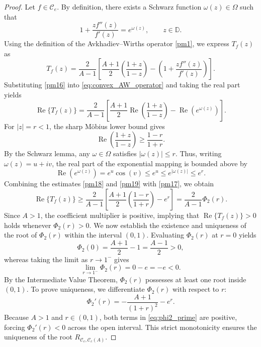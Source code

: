 \documentclass[12pt]{article}
\renewcommand{\Re}{\operatorname{Re}}
\begin{document}
\begin{proof}
Let $f\in\mathcal{C}_e$. By definition, there exists a Schwarz function $\omega(z)\in\Omega$ such that
\begin{equation}\label{pm16}
1+\frac{zf''(z)}{f'(z)} = e^{\omega(z)}, \qquad z\in\mathbb{D}.
\end{equation}
Using the definition of the Avkhadiev--Wirths operator \eqref{pm1}, we express $T_f(z)$ as
\begin{equation}\label{eq:convex_AW_operator}
T_f(z) = \frac{2}{A-1} \left[ \frac{A+1}{2} \left( \frac{1+z}{1-z} \right) - \left( 1+\frac{zf''(z)}{f'(z)} \right) \right].
\end{equation}
Substituting \eqref{pm16} into \eqref{eq:convex_AW_operator} and taking the real part yields
\begin{equation}\label{pm17}
\Re\{T_f(z)\} = \frac{2}{A-1} \left[ \frac{A+1}{2} \Re\left( \frac{1+z}{1-z} \right) - \Re\left( e^{\omega(z)} \right) \right].
\end{equation}
For $|z|=r<1$, the sharp M\"obius lower bound gives
\begin{equation}\label{pm18}
\Re\left( \frac{1+z}{1-z} \right) \ge \frac{1-r}{1+r}.
\end{equation}
By the Schwarz lemma, any $\omega \in \Omega$ satisfies $|\omega(z)|\le r$. Thus, writing $\omega(z)=u+iv$, the real part of the exponential mapping is bounded above by
\begin{equation}\label{pm19}
\Re\left( e^{\omega(z)} \right) = e^{u}\cos(v) \le e^u \le e^{|\omega(z)|} \le e^r.
\end{equation}
Combining the estimates \eqref{pm18} and \eqref{pm19} with \eqref{pm17}, we obtain
\begin{equation}\label{eq:convex_final_bound}
\Re\{T_f(z)\} \ge \frac{2}{A-1} \left[ \frac{A+1}{2} \left( \frac{1-r}{1+r} \right) - e^r \right] = \frac{2}{A-1}\Phi_2(r).
\end{equation}
Since $A > 1$, the coefficient multiplier is positive, implying that $\Re\{T_f(z)\}>0$ holds whenever $\Phi_2(r)>0$.
We now establish the existence and uniqueness of the root of $\Phi_2(r)$ within the interval $(0,1)$. Evaluating $\Phi_2(r)$ at $r=0$ yields
\[
\Phi_2(0) = \frac{A+1}{2} - 1 = \frac{A-1}{2} > 0,
\]
whereas taking the limit as $r \to 1^-$ gives
\[
\lim_{r\to1^-}\Phi_2(r) = 0 - e = -e < 0.
\]
By the Intermediate Value Theorem, $\Phi_2(r)$ possesses at least one root inside $(0,1)$. To prove uniqueness, we differentiate $\Phi_2(r)$ with respect to $r$:
\begin{equation}\label{eq:phi2_prime}
\Phi_2'(r) = -\frac{A+1}{(1+r)^2} - e^r.
\end{equation}
Because $A > 1$ and $r \in (0,1)$, both terms in \eqref{eq:phi2_prime} are positive, forcing $\Phi_2'(r)<0$ across the open interval. This strict monotonicity ensures the uniqueness of the root $R_{\mathcal{C}_e,\mathcal{C}_c(A)}$.


\end{proof}
\end{document}
